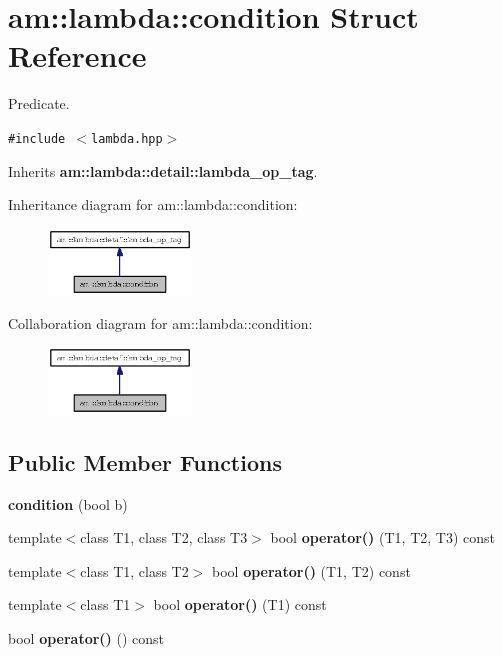 \section{am::lambda::condition Struct Reference}
\label{structam_1_1lambda_1_1condition}
Predicate.  


{\tt \#include $<$lambda.hpp$>$}

Inherits {\bf am::lambda::detail::lambda\_\-op\_\-tag}.

Inheritance diagram for am::lambda::condition:\begin{figure}[H]
\begin{center}
\leavevmode
\includegraphics[width=108pt]{structam_1_1lambda_1_1condition__inherit__graph}
\end{center}
\end{figure}
Collaboration diagram for am::lambda::condition:\begin{figure}[H]
\begin{center}
\leavevmode
\includegraphics[width=108pt]{structam_1_1lambda_1_1condition__coll__graph}
\end{center}
\end{figure}
\subsection*{Public Member Functions}
\begin{CompactItemize}
\item 
\textbf{condition} (bool b)\label{structam_1_1lambda_1_1condition_e40f01ee1d36564ae8fc2741d810ee67}

\item 
template$<$class T1, class T2, class T3$>$ bool \textbf{operator()} (T1, T2, T3) const\label{structam_1_1lambda_1_1condition_01b6a3632c9427e5751d25553c0b7299}

\item 
template$<$class T1, class T2$>$ bool \textbf{operator()} (T1, T2) const\label{structam_1_1lambda_1_1condition_7c9b36804edcb13cd6d92de83557abd9}

\item 
template$<$class T1$>$ bool \textbf{operator()} (T1) const\label{structam_1_1lambda_1_1condition_08a614f29cafff6959b43fc64485e40b}

\item 
bool \textbf{operator()} () const\label{structam_1_1lambda_1_1condition_19e3c55b10f5c5edf3fdf099d26a365c}

\end{CompactItemize}
